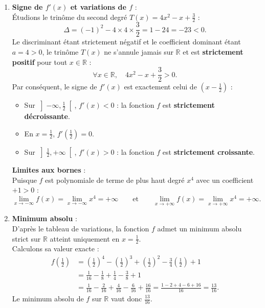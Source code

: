 \documentclass[11pt,a4paper]{article}
\newcommand{\R}{\mathbb{R}}
\begin{document}
\begin{correctionbox}
\begin{enumerate}[label=\textbf{\arabic*.}]
    \item \textbf{Signe de $f'(x)$ et variations de $f$} :\\
    Étudions le trinôme du second degré $T(x) = 4x^2 - x + \frac{3}{2}$ :
    \[
    \Delta = (-1)^2 - 4 \times 4 \times \frac{3}{2} = 1 - 24 = -23 < 0.
    \]
    Le discriminant étant strictement négatif et le coefficient dominant étant $a = 4 > 0$, le trinôme $T(x)$ ne s'annule jamais sur $\R$ et est \textbf{strictement positif} pour tout $x \in \R$ :
    \[
    \forall x \in \R, \quad 4x^2 - x + \frac{3}{2} > 0.
    \]
    Par conséquent, le signe de $f'(x)$ est exactement celui de $\left(x - \frac{1}{2}\right)$ :
    \begin{itemize}
        \item Sur $\left]-\infty, \frac{1}{2}\right[$, $f'(x) < 0$ : la fonction $f$ est \textbf{strictement décroissante}.
        \item En $x = \frac{1}{2}$, $f'\left(\frac{1}{2}\right) = 0$.
        \item Sur $\left]\frac{1}{2}, +\infty\right[$, $f'(x) > 0$ : la fonction $f$ est \textbf{strictement croissante}.
    \end{itemize}
    \textbf{Limites aux bornes} :\\
    Puisque $f$ est polynomiale de terme de plus haut degré $x^4$ avec un coefficient $+1 > 0$ :
    \[
    \lim_{x \to -\infty} f(x) = \lim_{x \to -\infty} x^4 = +\infty \qquad \text{et} \qquad \lim_{x \to +\infty} f(x) = \lim_{x \to +\infty} x^4 = +\infty.
    \]

    \item \textbf{Minimum absolu} :\\
    D'après le tableau de variations, la fonction $f$ admet un minimum absolu strict sur $\R$ atteint uniquement en $x = \frac{1}{2}$.\\
    Calculons sa valeur exacte :
    \begin{align*}
    f\left(\frac{1}{2}\right) &= \left(\frac{1}{2}\right)^4 - \left(\frac{1}{2}\right)^3 + \left(\frac{1}{2}\right)^2 - \frac{3}{4}\left(\frac{1}{2}\right) + 1 \\
    &= \frac{1}{16} - \frac{1}{8} + \frac{1}{4} - \frac{3}{8} + 1 \\
    &= \frac{1}{16} - \frac{2}{16} + \frac{4}{16} - \frac{6}{16} + \frac{16}{16} = \frac{1 - 2 + 4 - 6 + 16}{16} = \frac{13}{16}.
    \end{align*}
    Le minimum absolu de $f$ sur $\R$ vaut donc $\frac{13}{16}$.
\end{enumerate}
\end{correctionbox}
\end{document}
